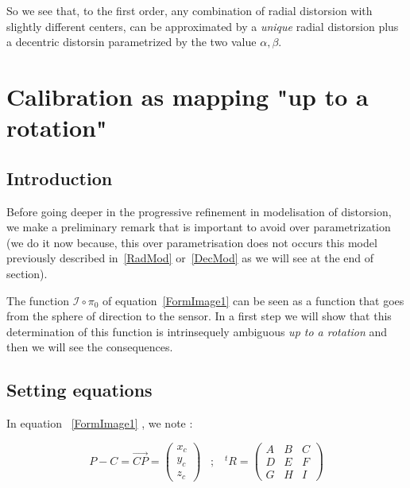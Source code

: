 So we see that, to the first order, any combination of radial distorsion with slightly different centers,
can be approximated by a \emph{unique} radial distorsion plus a decentric distorsin parametrized by the two value $\alpha,\beta$.


\section{Calibration as mapping "up to a rotation"}

\subsection{Introduction}

Before going deeper in the progressive refinement in modelisation of
distorsion, we  make a preliminary remark that is important
to avoid over parametrization (we do it now because, this over parametrisation
does not occurs this model previously described in~\ref{RadMod} or~\ref{DecMod} 
as we will see at the end of section).


The function $\mathcal{I} \circ \pi_0$  of equation~\ref{FormImage1} can be seen as a function that
goes from the sphere of direction to the sensor.  In a first
step we will show that this determination of this function is intrinsequely ambiguous
\emph{up to a rotation} and then we will see the consequences.


\subsection{Setting equations}

In equation ~\ref{FormImage1} , we note :

\begin{equation}
	P-C =  \overrightarrow{CP}  = \begin{pmatrix} x_c \\ y_c \\ z_c \end{pmatrix} 
\;\;\;  ;  \;\;\;
        ^t R =  \begin{pmatrix}  A & B & C \\ D & E & F \\ G & H & I \end{pmatrix} 
\end{equation}


